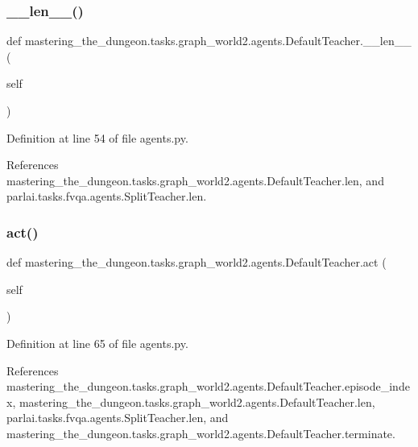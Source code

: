 \subsubsection{\texorpdfstring{\+\_\+\+\_\+len\+\_\+\+\_\+()}{\_\_len\_\_()}}
{\footnotesize\ttfamily def mastering\+\_\+the\+\_\+dungeon.\+tasks.\+graph\+\_\+world2.\+agents.\+Default\+Teacher.\+\_\+\+\_\+len\+\_\+\+\_\+ (\begin{DoxyParamCaption}\item[{}]{self }\end{DoxyParamCaption})}



Definition at line 54 of file agents.\+py.



References mastering\+\_\+the\+\_\+dungeon.\+tasks.\+graph\+\_\+world2.\+agents.\+Default\+Teacher.\+len, and parlai.\+tasks.\+fvqa.\+agents.\+Split\+Teacher.\+len.

\mbox{\label{classmastering__the__dungeon_1_1tasks_1_1graph__world2_1_1agents_1_1DefaultTeacher_a5ccf5764a4f27819a6b6b7c0cda603bf}} 
\subsubsection{\texorpdfstring{act()}{act()}}
{\footnotesize\ttfamily def mastering\+\_\+the\+\_\+dungeon.\+tasks.\+graph\+\_\+world2.\+agents.\+Default\+Teacher.\+act (\begin{DoxyParamCaption}\item[{}]{self }\end{DoxyParamCaption})}



Definition at line 65 of file agents.\+py.



References mastering\+\_\+the\+\_\+dungeon.\+tasks.\+graph\+\_\+world2.\+agents.\+Default\+Teacher.\+episode\+\_\+index, mastering\+\_\+the\+\_\+dungeon.\+tasks.\+graph\+\_\+world2.\+agents.\+Default\+Teacher.\+len, parlai.\+tasks.\+fvqa.\+agents.\+Split\+Teacher.\+len, and mastering\+\_\+the\+\_\+dungeon.\+tasks.\+graph\+\_\+world2.\+agents.\+Default\+Teacher.\+terminate.

